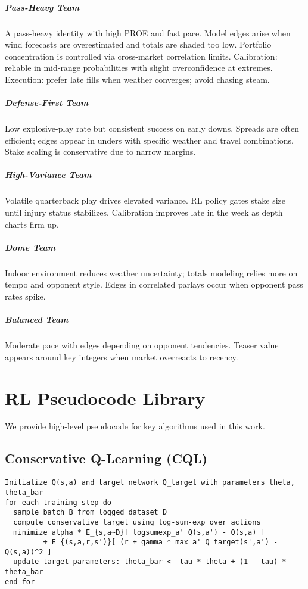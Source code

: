\documentclass[12pt]{report}  %
\numberwithin{equation}{section}
\theoremstyle{plain}
\theoremstyle{definition}
\theoremstyle{remark}
\begin{document}
\paragraph{Pass-Heavy Team} A pass-heavy identity with high PROE and fast pace. Model edges arise when wind forecasts are overestimated and totals are shaded too low. Portfolio concentration is controlled via cross-market correlation limits. Calibration: reliable in mid‑range probabilities with slight overconfidence at extremes. Execution: prefer late fills when weather converges; avoid chasing steam.

\paragraph{Defense-First Team} Low explosive-play rate but consistent success on early downs. Spreads are often efficient; edges appear in unders with specific weather and travel combinations. Stake scaling is conservative due to narrow margins.

\paragraph{High-Variance Team} Volatile quarterback play drives elevated variance. RL policy gates stake size until injury status stabilizes. Calibration improves late in the week as depth charts firm up.

\paragraph{Dome Team} Indoor environment reduces weather uncertainty; totals modeling relies more on tempo and opponent style. Edges in correlated parlays occur when opponent pass rates spike.

\paragraph{Balanced Team} Moderate pace with edges depending on opponent tendencies. Teaser value appears around key integers when market overreacts to recency.


\iffalse %
\chapter{RL Pseudocode Library}
We provide high-level pseudocode for key algorithms used in this work.

\section{Conservative Q-Learning (CQL)}
\begin{verbatim}
Initialize Q(s,a) and target network Q_target with parameters theta, theta_bar
for each training step do
  sample batch B from logged dataset D
  compute conservative target using log-sum-exp over actions
  minimize alpha * E_{s,a~D}[ logsumexp_a' Q(s,a') - Q(s,a) ]
         + E_{(s,a,r,s')}[ (r + gamma * max_a' Q_target(s',a') - Q(s,a))^2 ]
  update target parameters: theta_bar <- tau * theta + (1 - tau) * theta_bar
end for
\end{verbatim}
\end{document}
